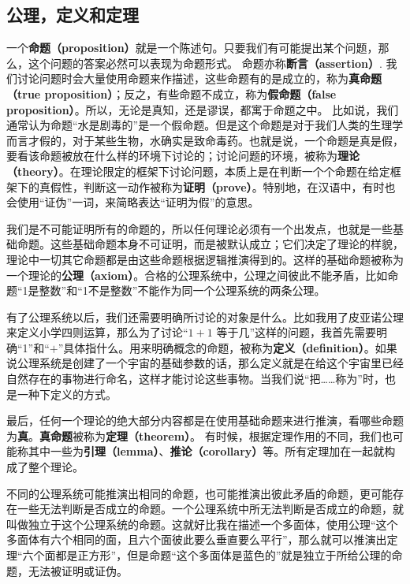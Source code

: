 
\subsection{公理，定义和定理}
一个\textbf{命题（proposition）}就是一个陈述句。只要我们有可能提出某个问题，那么，这个问题的答案必然可以表现为命题形式。 命题亦称\textbf{断言（assertion）}. 我们讨论问题时会大量使用命题来作描述，这些命题有的是成立的，称为\textbf{真命题（true proposition）}；反之，有些命题不成立，称为\textbf{假命题（false proposition）}。所以，无论是真知，还是谬误，都寓于命题之中。 比如说，我们通常认为命题“水是剧毒的”是一个假命题。但是这个命题是对于我们人类的生理学而言才假的，对于某些生物，水确实是致命毒药。也就是说，一个命题是真是假，要看该命题被放在什么样的环境下讨论的；讨论问题的环境，被称为\textbf{理论（theory）}。在理论限定的框架下讨论问题，本质上是在判断一个个命题在给定框架下的真假性，判断这一动作被称为\textbf{证明（prove）}。特别地，在汉语中，有时也会使用“证伪”一词，来简略表达“证明为假”的意思。

我们是不可能证明所有的命题的，所以任何理论必须有一个出发点，也就是一些基础命题。这些基础命题本身不可证明，而是被默认成立；它们决定了理论的样貌，理论中一切其它命题都是由这些命题根据逻辑推演得到的。这样的基础命题被称为一个理论的\textbf{公理（axiom）}。合格的公理系统中，公理之间彼此不能矛盾，比如命题“1是整数”和“1不是整数”不能作为同一个公理系统的两条公理。

有了公理系统以后，我们还需要明确所讨论的对象是什么。比如我用了皮亚诺公理来定义小学四则运算，那么为了讨论“$1+1$ 等于几”这样的问题，我首先需要明确“1”和“$+$”具体指什么。用来明确概念的命题，被称为\textbf{定义（definition）}。如果说公理系统是创建了一个宇宙的基础参数的话，那么定义就是在给这个宇宙里已经自然存在的事物进行命名，这样才能讨论这些事物。当我们说“把……称为”时，也是一种下定义的方式。

最后，任何一个理论的绝大部分内容都是在使用基础命题来进行推演，看哪些命题为\textbf{真}。\textbf{真命题}被称为\textbf{定理（theorem）}。 有时候，根据定理作用的不同，我们也可能称其中一些为\textbf{引理（lemma）}、\textbf{推论（corollary）}等。所有定理加在一起就构成了整个理论。

不同的公理系统可能推演出相同的命题，也可能推演出彼此矛盾的命题，更可能存在一些无法判断是否成立的命题。一个公理系统中所无法判断是否成立的命题，就叫做独立于这个公理系统的命题。这就好比我在描述一个多面体，使用公理“这个多面体有六个相同的面，且六个面彼此要么垂直要么平行”，那么就可以推演出定理“六个面都是正方形”，但是命题“这个多面体是蓝色的”就是独立于所给公理的命题，无法被证明或证伪。

